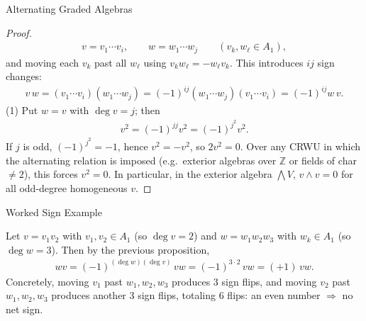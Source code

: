 \begin{frame}{Alternating Graded Algebras}
\vspace{-0.3cm}
\begin{proof}
\vspace{-0.9cm}
\begin{align*}
v = v_1\cdots v_i,\qquad w = w_1\cdots w_j \qquad (v_k,w_\ell\in A_1),
\end{align*}
and moving each $v_k$ past all $w_\ell$ using $v_k w_\ell = - w_\ell v_k$. This introduces $ij$ sign changes:
\vspace{-0.2cm}
\begin{align*}
v\,w = (v_1\cdots v_i)(w_1\cdots w_j) = (-1)^{ij} (w_1\cdots w_j)(v_1\cdots v_i) = (-1)^{ij} w\,v.
\end{align*}
(1) Put $w=v$ with $\deg v = j$; then
\vspace{-0.2cm}
\begin{align*}
v^2 = (-1)^{jj} v^2 = (-1)^{j^2} v^2.
\end{align*}
If $j$ is odd, $(-1)^{j^2}=-1$, hence $v^2=-v^2$, so $2v^2=0$.
Over any CRWU in which the alternating relation is imposed (e.g.\ exterior algebras over $\mathbb{Z}$ or fields of char $\ne 2$), this forces $v^2=0$. In particular, in the exterior algebra $\bigwedge V$, $v\wedge v=0$ for all odd-degree homogeneous $v$.
\end{proof}
\end{frame}

\begin{frame}{Worked Sign Example}
\begin{block}{}

\end{block}
Let $v=v_1 v_2$ with $v_1,v_2\in A_1$ (so $\deg v=2$) and $w=w_1 w_2 w_3$ with $w_k\in A_1$ (so $\deg w=3$).
Then by the previous proposition,
\begin{align*}
w v = (-1)^{(\deg w)(\deg v)}\, v w = (-1)^{3\cdot 2}\, v w = (+1)\, v w.
\end{align*}
Concretely, moving $v_1$ past $w_1,w_2,w_3$ produces $3$ sign flips, and moving $v_2$ past $w_1,w_2,w_3$ produces another $3$ sign flips, totaling $6$ flips: an even number $\Rightarrow$ no net sign.
\end{frame}

